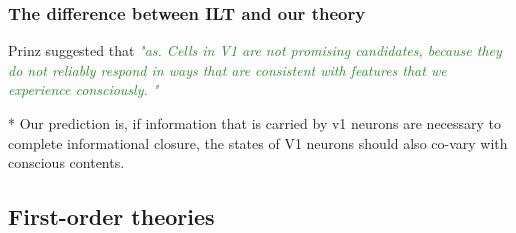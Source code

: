 \documentclass[utf8]{article}
\newcommand{\rewrite}[1]{\textcolor{ForestGreen}{\textit{"#1"}}\newline}
\begin{document}
		
			\subsubsection{The difference between ILT and our theory}
				Prinz suggested that \rewrite{as. Cells in V1 are not promising candidates, because they do not reliably respond in ways that are consistent with features that we experience consciously. } \cite{prinz2007intermediate}
				
				* Our prediction is, if information that is carried by v1 neurons are necessary to complete informational closure, the states of V1 neurons should also co-vary with conscious contents. 	
				
		\subsection{First-order theories}
\end{document}
